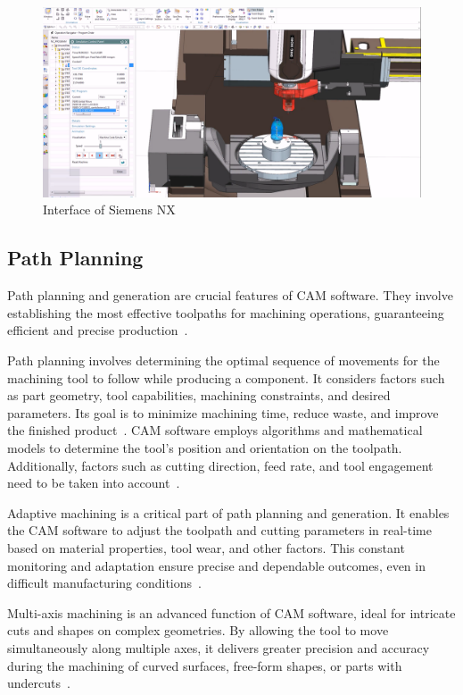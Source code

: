 \begin{figure}[H]
	\centerline{\includegraphics[scale=.4]{figures/CAM.png}}
	\caption{Interface of Siemens NX~\cite{NXManufacturing.2015}}
	\label{CAMinterface}
\end{figure}


\subsection{Path Planning}\label{papla}
Path planning and generation are crucial features of CAM software. They involve establishing the most effective toolpaths for machining operations, guaranteeing efficient and precise production~\cite{Brecher.2013}.

Path planning involves determining the optimal sequence of movements for the machining tool to follow while producing a component. It considers factors such as part geometry, tool capabilities, machining constraints, and desired parameters. Its goal is to minimize machining time, reduce waste, and improve the finished product~\cite{Xu.2015}. CAM software employs algorithms and mathematical models to determine the tool's position and orientation on the toolpath. Additionally, factors such as cutting direction, feed rate, and tool engagement need to be taken into account~\cite{Tunc.2017}.

Adaptive machining is a critical part of path planning and generation. It enables the CAM software to adjust the toolpath and cutting parameters in real-time based on material properties, tool wear, and other factors. This constant monitoring and adaptation ensure precise and dependable outcomes, even in difficult manufacturing conditions~\cite{Liu.2017}.

Multi-axis machining is an advanced function of CAM software, ideal for intricate cuts and shapes on complex geometries. By allowing the tool to move simultaneously along multiple axes, it delivers greater precision and accuracy during the machining of curved surfaces, free-form shapes, or parts with undercuts~\cite{Takeuchi.2014}.

